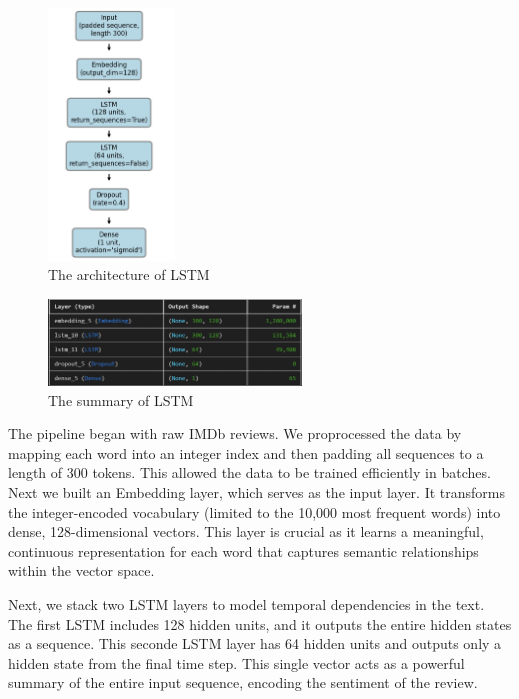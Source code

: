 \begin{figure}[ht]
    \centering
    \includegraphics[width=0.3\textwidth]{pics/lstm_architecture_designed.png}
    \caption{The architecture of LSTM}
\end{figure}

\begin{figure}[ht]
    \centering
    \includegraphics[width=0.6\textwidth]{pics/lstm_model.png}
    \caption{The summary of LSTM}
\end{figure}

The pipeline began with raw IMDb reviews. We proprocessed the data by mapping each word into an integer index and then padding all sequences to a length of 300 tokens. This allowed the data to be trained efficiently in batches. Next we built an Embedding layer, which serves as the input layer. It transforms the integer-encoded vocabulary (limited to the 10,000 most frequent words) into dense, 128-dimensional vectors. This layer is crucial as it learns a meaningful, continuous representation for each word that captures semantic relationships within the vector space.

Next, we stack two LSTM layers to model temporal dependencies in the text. The first LSTM includes 128 hidden units, and it outputs the entire hidden states as a sequence. This seconde LSTM layer has 64 hidden units and outputs only a hidden state from the final time step. This single vector acts as a powerful summary of the entire input sequence, encoding the sentiment of the review.

